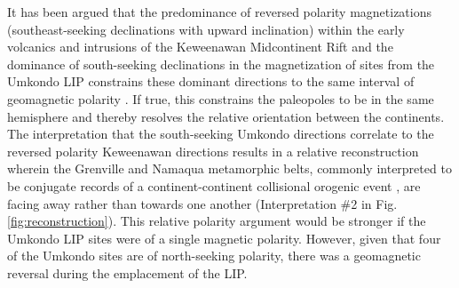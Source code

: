 \documentclass[11pt,letterpaper]{article}
\begin{document}
It has been argued that the predominance of reversed polarity magnetizations (southeast-seeking declinations with upward inclination) within the early volcanics and intrusions of the Keweenawan Midcontinent Rift and the dominance of south-seeking declinations in the magnetization of sites from the Umkondo LIP constrains these dominant directions to the same interval of geomagnetic polarity \citep{Hanson2004a, Evans2009a}. If true, this constrains the paleopoles to be in the same hemisphere and thereby resolves the relative orientation between the continents. The interpretation that the south-seeking Umkondo directions correlate to the reversed polarity Keweenawan directions results in a relative reconstruction wherein the Grenville and Namaqua metamorphic belts, commonly interpreted to be conjugate records of a continent-continent collisional orogenic event \citep{Dalziel2000a, Jacobs2008a}, are facing away rather than towards one another (Interpretation $\#$2 in Fig. \ref{fig:reconstruction}). This relative polarity argument would be stronger if the Umkondo LIP sites were of a single magnetic polarity. However, given that four of the Umkondo sites are of north-seeking polarity, there was a geomagnetic reversal during the emplacement of the LIP. 
\end{document}
